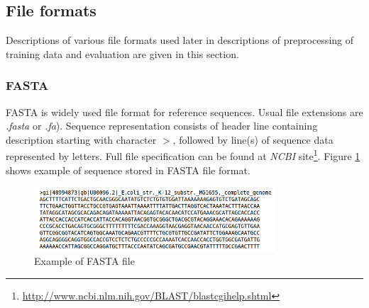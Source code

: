 \documentclass[times, utf8, diplomski, numeric, english]{fer}
\begin{document}
\subsection{File formats}
Descriptions of various file formats used later in descriptions of preprocessing of training data and evaluation are given in this section.
\subsubsection{FASTA}


FASTA is widely used file format for reference sequences. Usual file extensions are \textit{.fasta} or \textit{.fa}).
Sequence representation consists of header line containing description starting with character $ > $, followed by line(s) of sequence data represented by letters. Full file specification can be found at \textit{NCBI} site\footnote{\url{http://www.ncbi.nlm.nih.gov/BLAST/blastcgihelp.shtml}}.
Figure \ref{fg:fsta} shows example of sequence stored in FASTA file format.
\begin{figure}[!ht]
	\begin{center}
		\includegraphics[width=0.8\textwidth]{./imgs/fasta.png}
		\caption{Example of FASTA file}
		\label{fg:fsta}
	\end{center}
\end{figure} 
\end{document}
